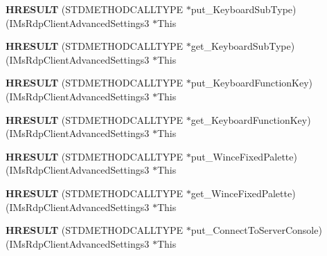 \begin{DoxyCompactItemize}
{\bfseries H\+R\+E\+S\+U\+LT} (S\+T\+D\+M\+E\+T\+H\+O\+D\+C\+A\+L\+L\+T\+Y\+PE $\ast$put\+\_\+\+Keyboard\+Sub\+Type)(I\+Ms\+Rdp\+Client\+Advanced\+Settings3 $\ast$This
\item 
\mbox{\label{struct_i_ms_rdp_client_advanced_settings3_vtbl_a41c696d7f5254dfc38ff8e934c5c3fb0}} 
{\bfseries H\+R\+E\+S\+U\+LT} (S\+T\+D\+M\+E\+T\+H\+O\+D\+C\+A\+L\+L\+T\+Y\+PE $\ast$get\+\_\+\+Keyboard\+Sub\+Type)(I\+Ms\+Rdp\+Client\+Advanced\+Settings3 $\ast$This
\item 
\mbox{\label{struct_i_ms_rdp_client_advanced_settings3_vtbl_a7469ae799146e2f42285d49561d21384}} 
{\bfseries H\+R\+E\+S\+U\+LT} (S\+T\+D\+M\+E\+T\+H\+O\+D\+C\+A\+L\+L\+T\+Y\+PE $\ast$put\+\_\+\+Keyboard\+Function\+Key)(I\+Ms\+Rdp\+Client\+Advanced\+Settings3 $\ast$This
\item 
\mbox{\label{struct_i_ms_rdp_client_advanced_settings3_vtbl_aea7d101f80b0a23245bd3648e6d318b9}} 
{\bfseries H\+R\+E\+S\+U\+LT} (S\+T\+D\+M\+E\+T\+H\+O\+D\+C\+A\+L\+L\+T\+Y\+PE $\ast$get\+\_\+\+Keyboard\+Function\+Key)(I\+Ms\+Rdp\+Client\+Advanced\+Settings3 $\ast$This
\item 
\mbox{\label{struct_i_ms_rdp_client_advanced_settings3_vtbl_acd798c14987e96462807c1c0c3d547c4}} 
{\bfseries H\+R\+E\+S\+U\+LT} (S\+T\+D\+M\+E\+T\+H\+O\+D\+C\+A\+L\+L\+T\+Y\+PE $\ast$put\+\_\+\+Wince\+Fixed\+Palette)(I\+Ms\+Rdp\+Client\+Advanced\+Settings3 $\ast$This
\item 
\mbox{\label{struct_i_ms_rdp_client_advanced_settings3_vtbl_a772093606d47df53d232c243407c4993}} 
{\bfseries H\+R\+E\+S\+U\+LT} (S\+T\+D\+M\+E\+T\+H\+O\+D\+C\+A\+L\+L\+T\+Y\+PE $\ast$get\+\_\+\+Wince\+Fixed\+Palette)(I\+Ms\+Rdp\+Client\+Advanced\+Settings3 $\ast$This
\item 
\mbox{\label{struct_i_ms_rdp_client_advanced_settings3_vtbl_a5cb2b6f0701b38f88a83757cef261987}} 
{\bfseries H\+R\+E\+S\+U\+LT} (S\+T\+D\+M\+E\+T\+H\+O\+D\+C\+A\+L\+L\+T\+Y\+PE $\ast$put\+\_\+\+Connect\+To\+Server\+Console)(I\+Ms\+Rdp\+Client\+Advanced\+Settings3 $\ast$This

\end{DoxyCompactItemize}
